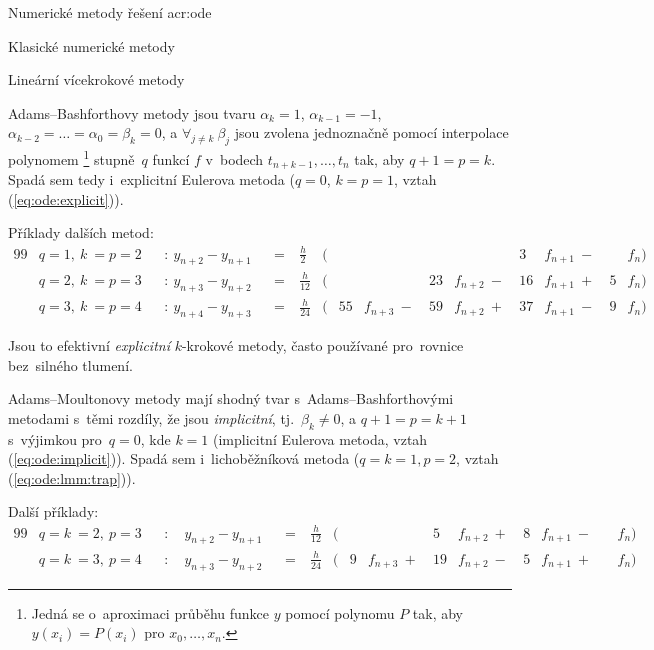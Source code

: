 \documentclass[thesis=M,czech]{FITthesis}[2012/06/26]
\newcommand{\acrlabel}[1]{acr:#1}
\newcommand{\acr}[1]{\acrshort{\acrlabel{#1}}}
\newcommand{\hl}[1]{\textit{#1}}
\newcommand{\rf}[1]{\ref{#1}}
\newcommand{\rfeq}[1]{(\rf{eq:#1})}
\begin{document}
\begin{section}{Numerické metody řešení \acr{ode}}
\begin{subsection}{Klasické numerické metody}
\begin{subsubsection}{Lineární vícekrokové metody}

\begin{paragraph}{Adams--Bashforthovy metody}
\label{p:search:ode:classic:lmm:adamsb}
jsou tvaru ${\alpha_{k} = 1}$, ${\alpha_{k-1} = -1}$,
$\alpha_{k-2} = \dots = \alpha_{0} = \beta_k = 0$,
a ${\forall_{j \neq k} \: \beta_{j}}$ jsou zvolena jednoznačně
pomocí interpolace polynomem%
\footnote{Jedná se o~aproximaci průběhu funkce $y$ pomocí polynomu $P$
tak, aby ${y(x_i) = P(x_i)}$ pro ${x_0, \dots, x_n}$.}
stupně~$q$ funkcí $f$ v~bodech ${t_{n+k-1}, \dots, t_{n}}$ tak,
aby ${q+1 = p = k}$.
Spadá sem tedy i~explicitní Eulerova metoda
(${q = 0}$, ${k = p = 1}$, vztah \rfeq{ode:explicit}).

Příklady dalších metod:
\begin{alignat*}{99}
   &q = 1, \: k~= p = 2 &&: \  y_{n+2} - y_{n+1} &&= \:
      & \frac{h}{2}\: & ( &    &         \: \: &    &         \: \:
      &  3 & f_{n+1} \:-\: &   & f_{n} ) \\
   &q = 2, \: k~= p = 3 &&: \  y_{n+3} - y_{n+2} &&= \:
      & \frac{h}{12}  & ( &    &         \: \: & 23 & f_{n+2} \:-\:
      & 16 & f_{n+1} \:+\: & 5 & f_{n} ) \\
   &q = 3, \: k~= p = 4 &&: \  y_{n+4} - y_{n+3} &&= \:
      & \frac{h}{24}  & ( & 55 & f_{n+3} \:-\: & 59 & f_{n+2} \:+\:
      & 37 & f_{n+1} \:-\: & 9 & f_{n} )
\end{alignat*}

Jsou to efektivní \hl{explicitní} $k$-krokové metody,
často používané pro~rovnice bez~silného tlumení.
\end{paragraph} %


\begin{paragraph}{Adams--Moultonovy metody}
\label{p:search:ode:classic:lmm:adamsm}
mají shodný tvar s~Adams--Bashforthovými metodami
s~těmi rozdíly, že jsou \hl{implicitní},
tj.~${\beta_k \neq 0}$,
a ${q+1 = p = k+1}$
s~výjimkou pro~${q = 0}$, kde ${k = 1}$
(implicitní Eulerova metoda, vztah \rfeq{ode:implicit}).
Spadá sem i~lichoběžníková metoda
(${q = k = 1}, {p = 2}$, vztah \rfeq{ode:lmm:trap}).

Další příklady:
\begin{alignat*}{99}
   &q = k~= 2, \: p = 3 &&: \quad y_{n+2} - y_{n+1} &&= \:
      & \frac{h}{12} & ( &   &         \: \: &  5 & f_{n+2} \:+\:
      & 8 & f_{n+1} \:-\: &   & f_{n} ) \\
   &q = k~= 3, \: p = 4 &&: \quad y_{n+3} - y_{n+2} &&= \:
      & \frac{h}{24} & ( & 9 & f_{n+3} \:+\: & 19 & f_{n+2} \:-\:
      & 5 & f_{n+1} \:+\: &   & f_{n} )
\end{alignat*}
\end{paragraph} %


\end{subsubsection}
\end{subsection}
\end{section}
\end{document}

